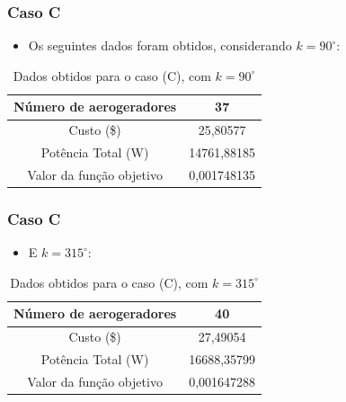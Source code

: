 \documentclass{beamer}
\begin{document}
	\begin{frame}
		\frametitle{Caso C}
		\begin{itemize}
			\item Os seguintes dados foram obtidos, considerando $ k = 90^{\circ} $:
		\end{itemize}
		\begin{table}[H]
			\centering
			\begin{tabular}{|c|c|}
				\hline
				Número de aerogeradores & 37 \\
				\hline
				Custo (\$) & 25,80577 \\
				\hline
				Potência Total (W) & 14761,88185 \\
				\hline
				Valor da função objetivo & 0,001748135 \\
				\hline
			\end{tabular}
			\caption{Dados obtidos para o caso (C), com $ k = 90^{\circ} $}
			\label{tab:casoc90}
		\end{table}	
	\end{frame}

	\begin{frame}
		\frametitle{Caso C}
		\begin{itemize}
			\item E $ k = 315^{\circ} $:
		\end{itemize}
		\begin{table}[H]
			\centering
			\begin{tabular}{|c|c|}
				\hline
				Número de aerogeradores & 40 \\
				\hline
				Custo (\$) & 27,49054 \\
				\hline
				Potência Total (W) & 16688,35799 \\
				\hline
				Valor da função objetivo & 0,001647288 \\
				\hline
			\end{tabular}
			\caption{Dados obtidos para o caso (C), com $ k = 315^{\circ} $}
			\label{tab:casoc315}
		\end{table}	
	\end{frame}
\end{document}
